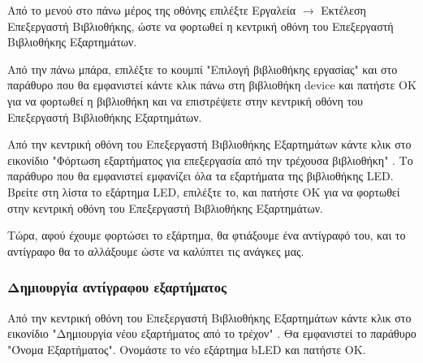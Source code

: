 \documentclass[a4paper]{article}
\begin{document}
Από το μενού στο πάνω μέρος της οθόνης επιλέξτε Εργαλεία $\rightarrow$ Εκτέλεση Επεξεργαστή Βιβλιοθήκης, ώστε να φορτωθεί η κεντρική οθόνη του Επεξεργαστή Βιβλιοθήκης Εξαρτημάτων.

\begin{figure}
  \begin{center}
    \label{fig:kicad-main}
  \end{center}
\end{figure}

Από την πάνω μπάρα, επιλέξτε το κουμπί "Επιλογή βιβλιοθήκης εργασίας" και στο παράθυρο που θα εμφανιστεί κάντε κλικ πάνω στη βιβλιοθήκη device και πατήστε ΟΚ για να φορτωθεί η βιβλιοθήκη και να επιστρέψετε στην κεντρική οθόνη του Επεξεργαστή Βιβλιοθήκης Εξαρτημάτων.

Από την κεντρική οθόνη του Επεξεργαστή Βιβλιοθήκης Εξαρτημάτων κάντε κλικ στο εικονίδιο "Φόρτωση εξαρτήματος για επεξεργασία από την τρέχουσα βιβλιοθήκη" %
. Το παράθυρο που θα εμφανιστεί εμφανίζει όλα τα εξαρτήματα της βιβλιοθήκης \textenglish{LED}. Βρείτε στη λίστα το εξάρτημα \textenglish{LED}, επιλέξτε το, και πατήστε ΟΚ για να φορτωθεί στην κεντρική οθόνη του Επεξεργαστή Βιβλιοθήκης Εξαρτημάτων.

\begin{figure}
  \begin{center}
    \label{fig:kicad-main}
  \end{center}
\end{figure}

Τώρα, αφού έχουμε φορτώσει το εξάρτημα, θα φτιάξουμε ένα αντίγραφό του, και το αντίγραφο θα το αλλάξουμε ώστε να καλύπτει τις ανάγκες μας.

\subsubsection{Δημιουργία αντίγραφου εξαρτήματος}

Από την κεντρική οθόνη του Επεξεργαστή Βιβλιοθήκης Εξαρτημάτων κάντε κλικ στο εικονίδιο "Δημιουργία νέου εξαρτήματος από το τρέχον" %
. Θα εμφανιστεί το παράθυρο "Όνομα Εξαρτήματος". Ονομάστε το νέο εξάρτημα b\textenglish{LED} και πατήστε ΟΚ.

\begin{figure}
  \begin{center}
    \label{fig:kicad-main}
  \end{center}
\end{figure}
\end{document}
